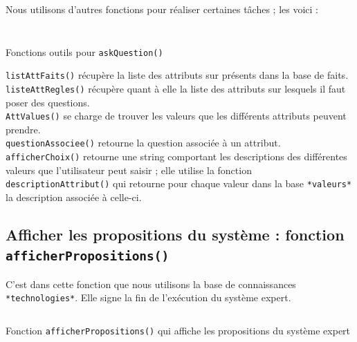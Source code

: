 \documentclass[a4paper,12pt]{article}
\begin{document}
Nous utilisons d'autres fonctions pour réaliser certaines tâches ; les voici : 

\begin{listing}[H]
	\centering
	\inputminted[breaklines=true,linenos, firstline = 24,lastline = 71]{lisp}{../askQuestion.lisp}
\end{listing}

\begin{listing}[H]
	\centering
	\inputminted[breaklines=true,linenos, firstline = 73]{lisp}{../askQuestion.lisp}
	\caption{Fonctions outils pour \texttt{askQuestion()}}
\end{listing}

\texttt{listAttFaits()} récupère la liste des attributs sur présents dans la base de faits.\\

\texttt{listeAttRegles()} récupère quant à elle la liste des attributs sur lesquels il faut poser des questions.\\

\texttt{AttValues()} se charge de trouver les valeurs que les différents attributs peuvent prendre.\\

\texttt{questionAssociee()} retourne la question associée à un attribut.
\texttt{afficherChoix()} retourne une string comportant les descriptions des différentes valeurs que l'utilisateur peut saisir ; elle utilise la fonction
\texttt{descriptionAttribut()} qui retourne pour chaque valeur dans la base \texttt{*valeurs*} la description associée à celle-ci.



\subsection{Afficher les propositions du système : fonction \texttt{afficherPropositions()}}

	C'est dans cette fonction que nous utilisons la base de connaissances \texttt{*technologies*}. Elle signe la fin de l'exécution du système expert.

\begin{listing}[H]
	\centering
	\inputminted[breaklines=true,linenos,lastline=9]{lisp}{../afficherPropositions.lisp}
	\caption{Fonction \texttt{afficherPropositions()} qui affiche les propositions du système expert}
\end{listing}
\end{document}
